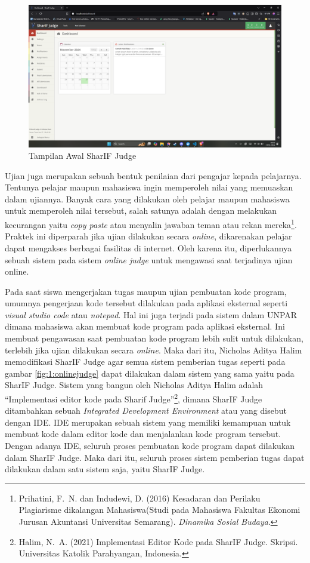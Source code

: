 \documentclass[a4paper,twoside]{article}
\begin{document}
\begin{figure}[H]
	\centering
	\includegraphics[width=\textwidth]{dashboard.png}
	\caption[Tampilan Awal SharIF Judge]{Tampilan Awal SharIF Judge}
	\label{fig:1:dashboardpng}
\end{figure}

Ujian juga merupakan sebuah bentuk penilaian dari pengajar kepada pelajarnya. Tentunya pelajar maupun mahasiswa ingin memperoleh nilai yang memuaskan dalam ujiannya. Banyak cara yang dilakukan oleh pelajar maupun mahasiswa untuk memperoleh nilai tersebut, salah satunya adalah dengan melakukan kecurangan yaitu \textit{copy paste} atau menyalin jawaban teman atau rekan mereka\footnote{Prihatini, F.~N. dan Indudewi, D. (2016) {Kesadaran dan Perilaku Plagiarisme dikalangan Mahasiswa(Studi pada Mahasiswa Fakultas Ekonomi Jurusan Akuntansi Universitas Semarang)}. {\em Dinamika Sosial Budaya}.}. Praktek ini diperparah jika ujian dilakukan secara \textit{online}, dikarenakan pelajar dapat mengakses berbagai fasilitas di internet. Oleh karena itu, diperlukannya sebuah sistem pada sistem \textit{online judge} untuk mengawasi saat terjadinya ujian online.

Pada saat siswa mengerjakan tugas maupun ujian pembuatan kode program, umumnya pengerjaan kode tersebut dilakukan pada aplikasi eksternal seperti \textit{visual studio code} atau \textit{notepad}. Hal ini juga terjadi pada sistem dalam UNPAR dimana mahasiswa akan membuat kode program pada aplikasi eksternal. Ini membuat pengawasan saat pembuatan kode program lebih sulit untuk dilakukan, terlebih jika ujian dilakukan secara \textit{online}. Maka dari itu, Nicholas Aditya Halim memodifikasi SharIF Judge agar semua sistem pemberian tugas seperti pada gambar \ref{fig:1:onlinejudge} dapat dilakukan dalam sistem yang sama yaitu pada SharIF Judge. Sistem yang bangun oleh Nicholas Aditya Halim adalah ``Implementasi editor kode pada Sharif Judge''\footnote{Halim, N.~A. (2021) {Implementasi Editor Kode pada SharIF Judge}. Skripsi. Universitas Katolik Parahyangan,  Indonesia.}, dimana SharIF Judge ditambahkan sebuah \textit{Integrated Development Environment} atau yang disebut dengan IDE. IDE merupakan sebuah sistem yang memiliki kemampuan untuk membuat kode dalam editor kode dan menjalankan kode program tersebut. Dengan adanya IDE, seluruh proses pembuatan kode program dapat dilakukan dalam SharIF Judge. Maka dari itu, seluruh proses sistem pemberian tugas dapat dilakukan dalam satu sistem saja, yaitu SharIF Judge.
\end{document}
